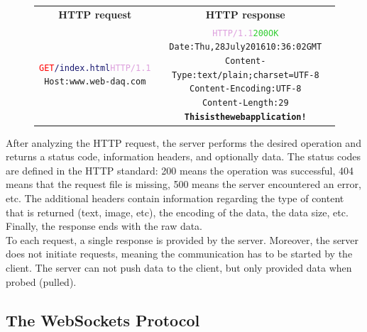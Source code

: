       \begin{figure}[h!]
        \begin{tabularx}{\textwidth}{C{1}C{1}}
          \textbf{HTTP request} & \textbf{HTTP response} \\
        { \footnotesize
\begin{alltt}
\textcolor{Red}{GET} \textcolor{MidnightBlue}{/index.html} \textcolor{Plum}{HTTP/1.1} \newline
\textcolor{BurntOrange}{Host:} www.web-daq.com
\end{alltt} } & { \footnotesize
\begin{alltt}
\textcolor{Plum}{HTTP/1.1} \textcolor{LimeGreen}{200 OK} \newline
\textcolor{BurntOrange}{Date:} Thu, 28 July 2016 10:36:02 GMT \newline
\textcolor{BurntOrange}{Content-Type:} text/plain; charset=UTF-8 \newline
\textcolor{BurntOrange}{Content-Encoding:} UTF-8 \newline
\textcolor{BurntOrange}{Content-Length:} 29 \newline
\textbf{This is the web application !}
\end{alltt} }
        \end{tabularx}
        \caption{}
        \label{fig:III-2-http}
      \end{figure}

      After analyzing the HTTP request, the server performs the desired operation and returns a status code, information headers, and optionally data. The status codes are defined in the HTTP standard: 200 means the operation was successful, 404 means that the request file is missing, 500 means the server encountered an error, etc. The additional headers contain information regarding the type of content that is returned (text, image, etc), the encoding of the data, the data size, etc. Finally, the response ends with the raw data. \\

      To each request, a single response is provided by the server. Moreover, the server does not initiate requests, meaning the communication has to be started by the client. The server can not push data to the client, but only provided data when probed (pulled).

    \subsection{The WebSockets Protocol}

